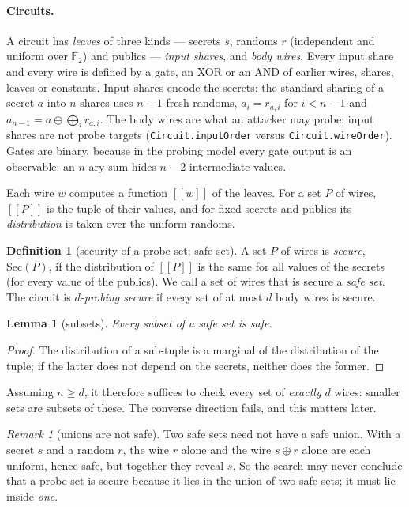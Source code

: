 \documentclass[11pt,a4paper]{article}
\newtheorem{lemma}[theorem]{Lemma}
\theoremstyle{definition}
\newtheorem{definition}[theorem]{Definition}
\theoremstyle{remark}
\newtheorem{remark}[theorem]{Remark}
\newcommand{\code}[1]{\texttt{\small #1}}
\newcommand{\Sec}{\mathrm{Sec}}
\newcommand{\F}{\mathbb{F}_2}
\begin{document}
\paragraph{Circuits.}  A circuit has \emph{leaves} of three kinds --- secrets $s$, randoms
$r$ (independent and uniform over $\F$) and publics --- \emph{input shares}, and
\emph{body wires}.  Every input share and every wire is defined by a gate, an XOR or an AND
of earlier wires, shares, leaves or constants.  Input shares encode the secrets: the
standard sharing of a secret $a$ into $n$ shares uses $n-1$ fresh randoms,
$a_i = r_{a,i}$ for $i<n-1$ and $a_{n-1} = a \oplus \bigoplus_i r_{a,i}$.  The body wires
are what an attacker may probe; input shares are not probe targets (\code{Circuit.inputOrder}
versus \code{Circuit.wireOrder}).  Gates are binary, because in the probing model every
gate output is an observable: an $n$-ary sum hides $n-2$ intermediate values.

Each wire $w$ computes a function $[\![w]\!]$ of the leaves.  For a set $P$ of wires,
$[\![P]\!]$ is the tuple of their values, and for fixed secrets and publics its
\emph{distribution} is taken over the uniform randoms.

\begin{definition}[security of a probe set; safe set]
A set $P$ of wires is \emph{secure}, $\Sec(P)$, if the distribution of $[\![P]\!]$ is the
same for all values of the secrets (for every value of the publics).  We call a set of
wires that is secure a \emph{safe set}.  The circuit is \emph{$d$-probing secure} if every
set of at most $d$ body wires is secure.
\end{definition}

\begin{lemma}[subsets]\label{lem:subset}
Every subset of a safe set is safe.
\end{lemma}
\begin{proof}
The distribution of a sub-tuple is a marginal of the distribution of the tuple; if the
latter does not depend on the secrets, neither does the former.
\end{proof}

Assuming $n \ge d$, it therefore suffices to check every set of \emph{exactly} $d$ wires:
smaller sets are subsets of these.  The converse direction fails, and this matters later.

\begin{remark}[unions are not safe]\label{rem:union}
Two safe sets need not have a safe union.  With a secret $s$ and a random $r$, the wire
$r$ alone and the wire $s\oplus r$ alone are each uniform, hence safe, but together they
reveal $s$.  So the search may never conclude that a probe set is secure because it lies in
the union of two safe sets; it must lie inside \emph{one}.
\end{remark}
\end{document}
